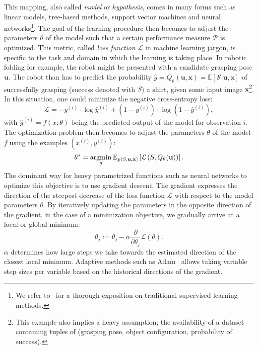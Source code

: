 \documentclass[\home/main.tex]{subfiles}
\begin{document}
This mapping, also called \textit{model} or \textit{hypothesis}, comes in many forms such as linear models, tree-based methods, support vector machines and neural networks\footnote{We refer to~\textcite{Murphy2012, Bishop2006, Hastie2001} for a thorough exposition on traditional supervised learning methods.}.
The goal of the learning procedure then becomes to adjust the parameters $\theta$ of the model such that a certain performance measure $\mathcal{P}$ is optimized. This metric, called \textit{loss function} $\mathcal{L}$ in machine learning jargon, is specific to the task and domain in which the learning is taking place. In robotic folding for example, the robot might be presented with a candidate grasping pose $\mathbf{u}$. The robot than has to predict the probability $\hat{y} = Q_{\theta}(\mathbf{u}, \mathbf{x}) = \mathbb{E}\left[ \mathcal{S} | \mathbf{u}, \mathbf{x} \right]$ of successfully grasping (success denoted with $S$) a shirt, given some input image $\mathbf{x}$\footnote{This example also implies a heavy assumption; the availability of a dataset containing tuples of (grasping pose, object configuration, probability of success).}.
In this situation, one could minimize the negative cross-entropy loss:
\begin{equation*}
	\mathcal{L}=-y^{(i)} \cdot \log \hat{y}^{(i)} +\left(1-y^{(i)}\right) \cdot \log \left(1-\hat{y}^{(i)}\right),
\end{equation*} with $\hat{y}^{(i)} = f(x;\theta)$ being the predicted output of the model for observation $i$.
The optimization problem then becomes to adjust the parameters $\theta$ of the model $f$ using the examples $\left(x^{(i)}, y^{(i)}\right)$:
\begin{equation*}
	\theta^{*}=\underset{\theta}{\operatorname*{argmin}} \: \mathbb{E}_{p(S, \mathbf{u}, \mathbf{x})}\left[\mathcal{L}\left(S, Q_{\theta}(\mathbf{u})\right)\right].
\end{equation*}
The dominant way for heavy parametrized functions such as neural networks to optimize this objective is to use gradient descent. The gradient expresses the direction of the steepest decrease of the loss function $\mathcal{L}$ with respect to the model parameters $\theta$. By iteratively updating the parameters in the opposite direction of the gradient, in the case of a minimization objective, we gradually arrive at a local or global minimum:
\begin{equation*}
	\theta_{j}:=\theta_{j}-\alpha \frac{\partial}{\partial \theta_{j}} \mathcal{L}(\theta).
\end{equation*}
$\alpha$ determines how large steps we take towards the estimated direction of the closest local minimum. Adaptive methods such as Adam~\autocite{Kingma2014} allows taking variable step sizes per variable based on the historical directions of the gradient.
\end{document}
